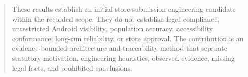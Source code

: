 \documentclass[11pt,a4paper]{article}
\begin{document}
\begin{abstract}
These results establish an initial store-submission engineering candidate within the recorded scope. They do not establish legal compliance, unrestricted Android visibility, population accuracy, accessibility conformance, long-run reliability, or store approval. The contribution is an evidence-bounded architecture and traceability method that separate statutory motivation, engineering heuristics, observed evidence, missing legal facts, and prohibited conclusions.
\end{abstract}
\newpage
\tableofcontents
\newpage







{\small


}
\end{document}
